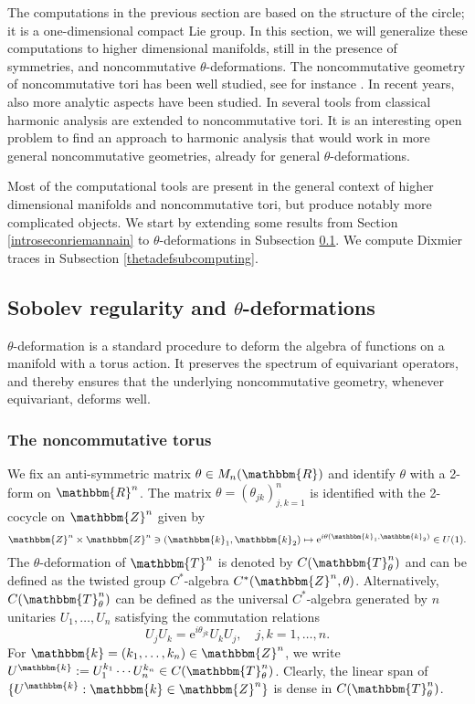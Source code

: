 \documentclass[10pt]{amsart}
\theoremstyle{remark}
\theoremstyle{definition}
\begin{document}
The computations in the previous section are based on the structure of the circle; it is a one-dimensional compact Lie group. In this section, we will generalize these computations to higher dimensional manifolds, still in the presence of symmetries, and noncommutative $\theta$-deformations. The noncommutative geometry of noncommutative tori has been well studied, see for instance \cite{bramessuj,c,conneslandi,yamashitadeform}. In recent years, also more analytic aspects have been studied. In \cite{xiongxuyinfirst,xiongxuyin} several tools from classical harmonic analysis are extended to noncommutative tori. It is an interesting open problem to find an approach to harmonic analysis that would work in more general noncommutative geometries, already for general $\theta$-deformations.

Most of the computational tools are present in the general context of higher dimensional manifolds and noncommutative tori, but produce notably more complicated objects. We start by extending some results from Section \ref{introseconriemannain} to $\theta$-deformations in Subsection \ref{thetadefsub}. We compute Dixmier traces in Subsection \ref{thetadefsubcomputing}.

\subsection{Sobolev regularity and $\theta$-deformations}
\label{thetadefsub}

$\theta$-deformation is a standard procedure to deform the algebra of functions on a manifold with a torus action. It preserves the spectrum of equivariant operators, and thereby ensures that the underlying noncommutative geometry, whenever equivariant, deforms well. 

\subsubsection{The noncommutative torus}
We fix an anti-symmetric matrix $\theta\in M_n({\mathbbm{R}})$ and identify $\theta$ with a 2-form on ${\mathbbm{R}}^n$. The matrix $\theta=(\theta_{jk})_{j,k=1}^n$ is identified with the 2-cocycle on ${\mathbbm{Z}}^n$ given by 
$${\mathbbm{Z}}^n\times {\mathbbm{Z}}^n\ni (\mathbbm{k}_1,\mathbbm{k}_2)\mapsto {\mathrm{e}}^{i\theta(\mathbbm{k}_1,\mathbbm{k}_2)}\in U(1).$$
The $\theta$-deformation of ${\mathbbm{T}}^n$ is denoted by $C({\mathbbm{T}}^n_\theta)$ and can be defined as the twisted group $C^*$-algebra $C^*({\mathbbm{Z}}^n, \theta)$. Alternatively, $C({\mathbbm{T}}^n_\theta)$ can be defined as the universal $C^*$-algebra generated by $n$ unitaries $U_1,\ldots,U_n$ satisfying the commutation relations 
$$U_jU_k={\mathrm{e}}^{i\theta_{jk}}U_kU_j, \quad j,k=1,\ldots, n.$$
For $\mathbbm{k}=(k_1,\ldots,k_n)\in {\mathbbm{Z}}^n$, we write $U^{\mathbbm{k}}:=U_1^{k_1}\cdots U_n^{k_n}\in C({\mathbbm{T}}^n_\theta)$. Clearly, the linear span of $\{U^\mathbbm{k}:\mathbbm{k}\in {\mathbbm{Z}}^n\}$ is dense in $C({\mathbbm{T}}^n_\theta)$. 
\end{document}
